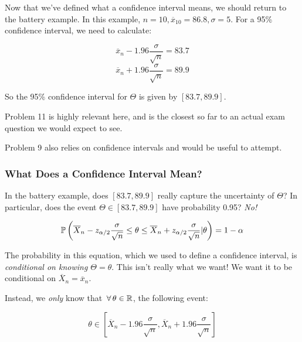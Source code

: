 \documentclass[a4paper]{article}
\begin{document}
                Now that we've defined what a confidence interval means, we
                should return to the battery example. In this example, $n = 10,
                \overline x_{10} = 86.8, \sigma = 5$. For a 95\% confidence
                interval, we need to calculate:

                \[
                    \overline x_n - 1.96 \frac{\sigma}{\sqrt{n}} = 83.7
                \]
                \[
                    \overline x_n + 1.96 \frac{\sigma}{\sqrt{n}} = 89.9
                \]

                So the 95\% confidence interval for $\Theta$ is given by
                $[83.7, 89.9]$.

                \begin{relq}
                    Problem 11 is highly relevant here, and is the closest so
                    far to an actual exam question we would expect to see.

                    Problem 9 also relies on confidence intervals and would be
                    useful to attempt.
                \end{relq}

            \subsubsection{What Does a Confidence Interval Mean?}
                In the battery example, does $[83.7, 89.9]$ really capture the
                uncertainty of $\Theta$? In particular, does the event $\Theta
                \in [83.7, 89.9]$ have probability 0.95? \textit{No!}

                \[
                    \mathbb{P}\left(\overline X_n - z_{\alpha/2}
                    \frac{\sigma}{\sqrt{n}} \leq \theta \leq \overline X_n +
                    z_{\alpha/2} \frac{\sigma}{\sqrt{n}}|\theta\right) = 1 -
                    \alpha
                \]

                The probability in this equation, which we used to define a
                confidence interval, is \textit{conditional on knowing $\Theta =
                \theta$}. This isn't really what we want! We want it to be
                conditional on $\overline X_n = \overline x_n$.

                Instead, we \textit{only} know that $\,\forall\, \theta \in \mathbb{R}$, the
                following event:

                \[
                    \theta \in \left[\overline X_n - 1.96
                    \frac{\sigma}{\sqrt{n}}, \overline X_n + 1.96
                    \frac{\sigma}{\sqrt{n}}\right]
                \]
\end{document}
